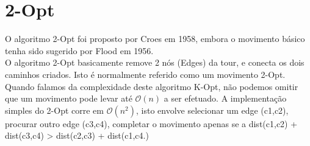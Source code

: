 \documentclass[12pt,a4paper,portrait]{article}
\begin{document}
	\section{2-Opt} 
			O algoritmo 2-Opt foi proposto por Croes em 1958, embora o movimento básico tenha sido sugerido por Flood em 1956.\\ 
			O algoritmo 2-Opt basicamente remove 2 nós (Edges) da tour, e conecta os dois caminhos criados. Isto é normalmente referido como um movimento 2-Opt.\\
			Quando falamos da complexidade deste algoritmo K-Opt, não podemos omitir que um movimento pode levar até $\mathcal{O}(n)$ a ser efetuado. A implementação simples do 2-Opt corre em $\mathcal{O}(n^{2})$, isto envolve selecionar um edge (c1,c2), procurar outro edge (c3,c4), completar o movimento apenas se a dist(c1,c2) + dist(c3,c4) > dist(c2,c3) + dist(c1,c4.)
\end{document}
